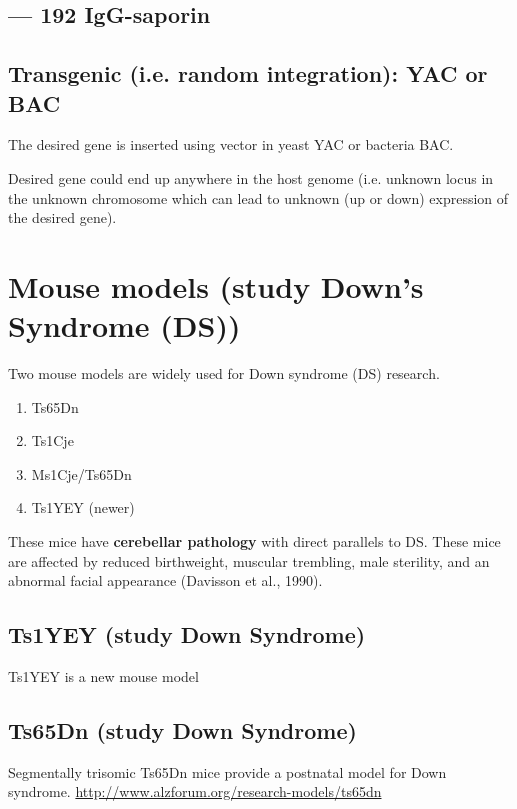 \subsection{--- 192 IgG-saporin}




\subsection{Transgenic (i.e. random integration): YAC or BAC}

The desired gene is inserted using vector in yeast YAC or bacteria BAC.

Desired gene could end up anywhere in the host genome (i.e. unknown locus in the
unknown chromosome which can lead to unknown (up or down) expression of the
desired gene).


\section{Mouse models (study Down's Syndrome (DS))}
\label{sec:mouse-model-DS-Down}

Two mouse models are widely used for Down syndrome (DS) research. 
\begin{enumerate}
  \item Ts65Dn
  
  \item Ts1Cje
  
  \item Ms1Cje/Ts65Dn
  
  \item Ts1YEY (newer)
\end{enumerate}

These mice have {\bf cerebellar pathology} with direct parallels to DS.
These mice are affected by reduced birthweight, muscular trembling, male
sterility, and an abnormal facial appearance (Davisson et al., 1990). 
 
\subsection{Ts1YEY (study Down Syndrome)}
\label{sec:Ts1YEY}

Ts1YEY is a new mouse model


\subsection{Ts65Dn (study Down Syndrome)}
\label{sec:Ts65Dn}

Segmentally trisomic Ts65Dn mice provide a postnatal model for Down syndrome.
\url{http://www.alzforum.org/research-models/ts65dn}

